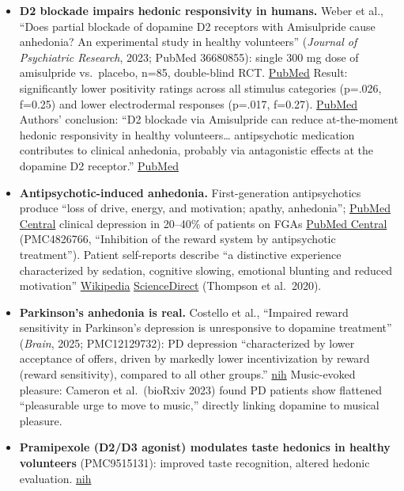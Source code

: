 \begin{itemize}
\tightlist
\item
  \textbf{D2 blockade impairs hedonic responsivity in humans.} Weber et al., ``Does partial blockade of dopamine D2 receptors with Amisulpride cause anhedonia? An experimental study in healthy volunteers'' (\emph{Journal of Psychiatric Research}, 2023; PubMed 36680855): single 300 mg dose of amisulpride vs.~placebo, n=85, double-blind RCT. \href{https://pubmed.ncbi.nlm.nih.gov/36680855/}{PubMed} Result: significantly lower positivity ratings across all stimulus categories (p=.026, f=0.25) and lower electrodermal responses (p=.017, f=0.27). \href{https://pubmed.ncbi.nlm.nih.gov/36680855/}{PubMed} Authors' conclusion: ``D2 blockade via Amisulpride can reduce at-the-moment hedonic responsivity in healthy volunteers\ldots{} antipsychotic medication contributes to clinical anhedonia, probably via antagonistic effects at the dopamine D2 receptor.'' \href{https://pubmed.ncbi.nlm.nih.gov/36680855/}{PubMed}
\item
  \textbf{Antipsychotic-induced anhedonia.} First-generation antipsychotics produce ``loss of drive, energy, and motivation; apathy, anhedonia''; \href{https://pmc.ncbi.nlm.nih.gov/articles/PMC4826766/}{PubMed Central} clinical depression in 20--40\% of patients on FGAs \href{https://pmc.ncbi.nlm.nih.gov/articles/PMC4826766/}{PubMed Central} (PMC4826766, ``Inhibition of the reward system by antipsychotic treatment''). Patient self-reports describe ``a distinctive experience characterized by sedation, cognitive slowing, emotional blunting and reduced motivation'' \href{https://en.wikipedia.org/wiki/Anhedonia}{Wikipedia} \href{https://www.sciencedirect.com/science/article/abs/pii/S0022395623000146}{ScienceDirect} (Thompson et al.~2020).
\item
  \textbf{Parkinson's anhedonia is real.} Costello et al., ``Impaired reward sensitivity in Parkinson's depression is unresponsive to dopamine treatment'' (\emph{Brain}, 2025; PMC12129732): PD depression ``characterized by lower acceptance of offers, driven by markedly lower incentivization by reward (reward sensitivity), compared to all other groups.'' \href{https://www.ncbi.nlm.nih.gov/pmc/articles/PMC12129732/}{nih} Music-evoked pleasure: Cameron et al.~(bioRxiv 2023) found PD patients show flattened ``pleasurable urge to move to music,'' directly linking dopamine to musical pleasure.
\item
  \textbf{Pramipexole (D2/D3 agonist) modulates taste hedonics in healthy volunteers} (PMC9515131): improved taste recognition, altered hedonic evaluation. \href{https://www.ncbi.nlm.nih.gov/pmc/articles/PMC9515131/}{nih}

\end{itemize}
